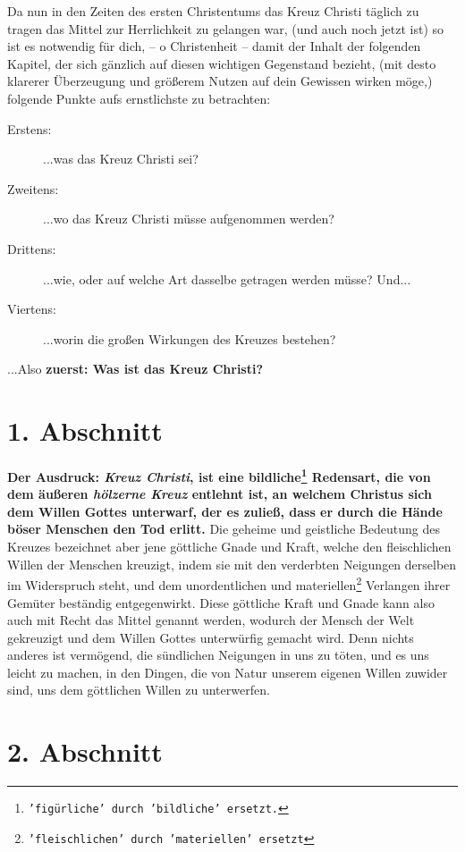 \newpage

Da nun in den Zeiten des ersten Christentums das Kreuz Christi täglich zu
tragen das Mittel zur Herrlichkeit zu gelangen war, (und auch noch jetzt ist)
so ist es notwendig für dich, -- o Christenheit -- damit der Inhalt der
folgenden
Kapitel, der sich gänzlich auf diesen wichtigen Gegenstand bezieht, (mit desto
klarerer Überzeugung und größerem Nutzen auf dein Gewissen wirken möge,)
folgende Punkte aufs ernstlichste zu betrachten:
\begin{description}
\item[Erstens:] ...was das Kreuz Christi sei?
\item[Zweitens:] ...wo das Kreuz Christi müsse aufgenommen werden?
\item[Drittens:] ...wie, oder auf welche Art dasselbe getragen werden müsse?
Und...
\item[Viertens:] ...worin die großen Wirkungen des Kreuzes bestehen?
\end{description}

...Also \textbf{zuerst: Was ist das Kreuz Christi?}


\section{1. Abschnitt} \label{kap3_ab1}

\label{ref:03_01_das_kreuz}
\textbf{Der Ausdruck: \textit{Kreuz Christi}, ist eine
bildliche\footnote{\texttt{'figürliche' durch 'bildliche' ersetzt.}} Redensart,
die von dem äußeren
\textit{hölzerne Kreuz} entlehnt ist, an welchem
 Christus sich dem Willen Gottes
unterwarf, der es zuließ, dass er durch die Hände böser Menschen den Tod
erlitt.}
Die geheime und geistliche Bedeutung des Kreuzes bezeichnet aber jene göttliche
Gnade und Kraft, welche den fleischlichen Willen der Menschen kreuzigt, indem
sie mit den verderbten Neigungen derselben im Widerspruch steht, und dem
unordentlichen und materiellen\footnote{\texttt{'fleischlichen' durch
'materiellen' ersetzt}} Verlangen ihrer Gemüter beständig
entgegenwirkt. Diese göttliche Kraft und Gnade kann also auch mit Recht das
Mittel genannt werden, wodurch der Mensch der Welt gekreuzigt und dem Willen
Gottes unterwürfig gemacht wird. Denn nichts anderes ist vermögend, die
sündlichen Neigungen in uns zu töten, und es uns leicht zu machen, in den
Dingen, die von Natur unserem eigenen Willen zuwider sind, uns dem göttlichen
Willen zu unterwerfen.

\section{2. Abschnitt} \label{kap3_ab2}

